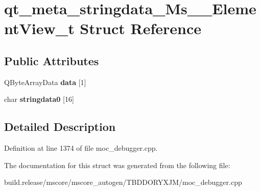 \hypertarget{structqt__meta__stringdata___ms_____element_view__t}{}\section{qt\+\_\+meta\+\_\+stringdata\+\_\+\+Ms\+\_\+\+\_\+\+Element\+View\+\_\+t Struct Reference}
\label{structqt__meta__stringdata___ms_____element_view__t}
\subsection*{Public Attributes}
\begin{DoxyCompactItemize}
\item 
\mbox{\label{structqt__meta__stringdata___ms_____element_view__t_ab1b4295ae7c6ff42596508947d6b1447}} 
Q\+Byte\+Array\+Data {\bfseries data} \mbox{[}1\mbox{]}
\item 
\mbox{\label{structqt__meta__stringdata___ms_____element_view__t_a515775ccf3161b3733ba40e02a664a9d}} 
char {\bfseries stringdata0} \mbox{[}16\mbox{]}
\end{DoxyCompactItemize}


\subsection{Detailed Description}


Definition at line 1374 of file moc\+\_\+debugger.\+cpp.



The documentation for this struct was generated from the following file\+:\begin{DoxyCompactItemize}
\item 
build.\+release/mscore/mscore\+\_\+autogen/\+T\+B\+D\+D\+O\+R\+Y\+X\+J\+M/moc\+\_\+debugger.\+cpp\end{DoxyCompactItemize}
